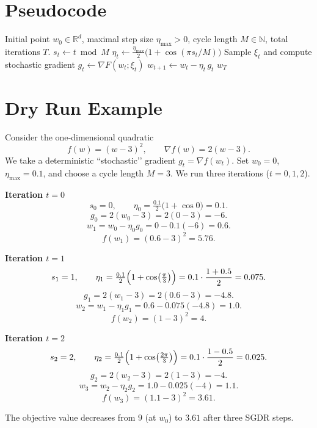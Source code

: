 \documentclass{article}
\newcommand{\R}{\mathbb{R}}
\begin{document}
\section*{Pseudocode}
\begin{algorithm}[H]
\caption{SGDR}
\begin{algorithmic}[1]
\REQUIRE Initial point $w_0\in\R^d$, maximal step size $\eta_{\max}>0$, cycle length $M\in\mathbb{N}$, total iterations $T$.
    \STATE $s_t \gets t \bmod M$
    \STATE $\displaystyle \eta_t \gets \frac{\eta_{\max}}{2}\bigl(1+\cos(\pi s_t / M)\bigr)$ 
    \STATE Sample $\xi_t$ and compute stochastic gradient $g_t \gets \nabla F(w_t;\xi_t)$
    \STATE $w_{t+1} \gets w_t - \eta_t\, g_t$ 
\ENDFOR
\RETURN $w_T$
\end{algorithmic}
\end{algorithm}

\section*{Dry Run Example}
Consider the one‑dimensional quadratic
\[
f(w)=(w-3)^2,\qquad \nabla f(w)=2(w-3).
\]
We take a deterministic “stochastic’’ gradient $g_t=\nabla f(w_t)$.  
Set $w_0=0$, $\eta_{\max}=0.1$, and choose a cycle length $M=3$.  
We run three iterations ($t=0,1,2$).

\bigskip
\noindent\textbf{Iteration $t=0$}
\[
s_0=0,\qquad 
\eta_0=\tfrac{0.1}{2}\bigl(1+\cos 0\bigr)=0.1.
\]
\[
g_0 = 2(w_0-3)=2(0-3)=-6.
\]
\[
w_1 = w_0-\eta_0 g_0 = 0-0.1(-6)=0.6.
\]
\[
f(w_1)=(0.6-3)^2=5.76.
\]

\bigskip
\noindent\textbf{Iteration $t=1$}
\[
s_1=1,\qquad 
\eta_1=\tfrac{0.1}{2}\Bigl(1+\cos\bigl(\tfrac{\pi}{3}\bigr)\Bigr)
      =0.1\cdot\frac{1+0.5}{2}=0.075.
\]
\[
g_1 = 2(w_1-3)=2(0.6-3)=-4.8.
\]
\[
w_2 = w_1-\eta_1 g_1 = 0.6-0.075(-4.8)=1.0.
\]
\[
f(w_2)=(1-3)^2=4.
\]

\bigskip
\noindent\textbf{Iteration $t=2$}
\[
s_2=2,\qquad 
\eta_2=\tfrac{0.1}{2}\Bigl(1+\cos\bigl(\tfrac{2\pi}{3}\bigr)\Bigr)
      =0.1\cdot\frac{1-0.5}{2}=0.025.
\]
\[
g_2 = 2(w_2-3)=2(1-3)=-4.
\]
\[
w_3 = w_2-\eta_2 g_2 = 1.0-0.025(-4)=1.1.
\]
\[
f(w_3)=(1.1-3)^2=3.61.
\]

The objective value decreases from $9$ (at $w_0$) to $3.61$ after three SGDR steps.
\end{document}
